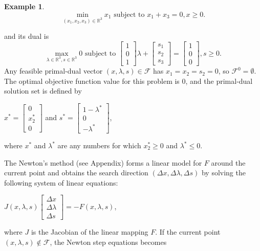 \documentclass[a4paper,10 pt,titlepage,twoside]{book}
\theoremstyle{plain}
\theoremstyle{definition}
\newtheorem{ex}[thm]{Example}
\theoremstyle{remark}
\begin{document}
\begin{ex}
	\begin{equation*}
	\min\limits_{(x_{1},x_{2},x_{3})\in\mathbb{R}^{3}} x_{1} \text{ subject to }x_{1} + x_{3} = 0, x\geq0.
	\end{equation*}

and its dual is 
	\begin{equation*}
\max\limits_{\lambda\in\mathbb{R}^{3}, s\in\mathbb{R}^{3}} 0 \text{ subject to } \begin{bmatrix}1\\0\\1\end{bmatrix}\lambda+\begin{bmatrix}
s_{1}\\s_{2}\\s_{3}
\end{bmatrix}=\begin{bmatrix}1\\0\\0\end{bmatrix}, s\geq0. 
\end{equation*}
Any feasible primal-dual vector $(x, \lambda, s)\in\mathcal{F}$ has $x_{1}= x_{2}= s_{2}= 0$, so $\mathcal{F}^{0}=\emptyset$. The optimal objective function value for this problem is 0, and the primal-dual solution set is defined by
\begin{center}
$x^{*} = \begin{bmatrix}
0\\x^{*}_{2}\\ 0
\end{bmatrix}$ and $s^{*}=\begin{bmatrix}
1-\lambda^{*}\\0\\-\lambda^{*}
\end{bmatrix}$,  
\end{center}
where $x^{*}$ and $\lambda^{*}$ are any numbers for which $x_{2}^{*}\geq0$ and $\lambda^{*}\leq0$.
\end{ex}
The Newton's method (see Appendix) forms a linear model for $\mathit{F}$ around the current point and obtains the search direction $(\Delta x,\Delta \lambda,\Delta s)$ by solving the following system of linear equations:
\begin{center}
	$\mathit{J}(x,\lambda,s)\begin{bmatrix}
	\Delta x\\\Delta\lambda \\\Delta s
	\end{bmatrix}=-\mathit{F}(x,\lambda,s)$,
\end{center}
where $\mathit{J}$ is the Jacobian of the linear mapping $\mathit{F}$. If the current point $(x, \lambda, s)\notin\mathcal{F}$, the Newton step equations becomes
\end{document}
